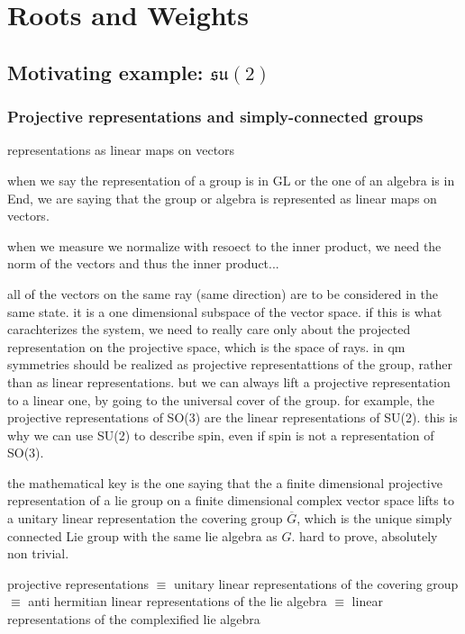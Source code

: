 \chapter{Roots and Weights}

\section{Motivating example: \(\mathfrak{su}(2)\)}

\subsection{Projective representations and simply-connected groups}

representations as linear maps on vectors

when we say the representation of a group is in GL or the one of an algebra is in End, we are saying that the group or algebra is represented as linear maps on vectors.

when we measure we normalize with resoect to the inner product, we need the norm of the vectors and thus the inner product...

all of the vectors on the same ray (same direction) are to be considered in the same state. it is a one dimensional subspace of the vector space. if this is what carachterizes the system, we need to really care only about the projected representation on the projective space, which is the space of rays. in qm symmetries should be realized as projective representattions of the group, rather than as linear representations. but we can always lift a projective representation to a linear one, by going to the universal cover of the group. for example, the projective representations of SO(3) are the linear representations of SU(2). this is why we can use SU(2) to describe spin, even if spin is not a representation of SO(3).

the mathematical key is the one saying that the a finite dimensional projective representation of a lie group on a finite dimensional complex vector space lifts to a unitary linear representation the covering group \(\overline{G}\), which is the unique simply connected Lie group with the same lie algebra as \(G\). hard to prove, absolutely non trivial.

projective representations \(\equiv\) unitary linear representations of the covering group \(\equiv\) anti hermitian linear representations of the lie algebra \(\equiv\) linear representations of the complexified lie algebra

